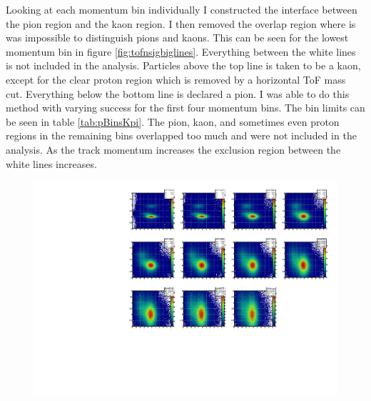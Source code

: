 \documentclass[abstract = on,listof=totoc, bibliography=totoc]{scrreprt}
\begin{document}
Looking at each momentum bin individually I constructed the interface between the pion region and the kaon region. I then removed the overlap region where is was impossible to distinguish pions and kaons. This can be seen for the lowest momentum bin in figure \ref{fig:tofnsigbiglines}. Everything between the white lines is not included in the analysis. Particles above the top line is taken to be a kaon, except for the clear proton region which is removed by a horizontal ToF mass cut. Everything below the bottom line is declared a pion. I was able to do this method with varying success for the first four momentum bins. The bin limits can be seen in table \ref{tab:pBinsKpi}. The pion, kaon, and sometimes even proton regions in the remaining bins overlapped too much and were not included in the analysis. As the track momentum increases the exclusion region between the white lines increases.    
\begin{figure}
\begin{center}
\includegraphics[width = 1\textwidth]{TofNSigmaPiPbins_new}
\caption[]{}
\label{fig:tofNSigma}
\end{center}
\end{figure}
\end{document}
